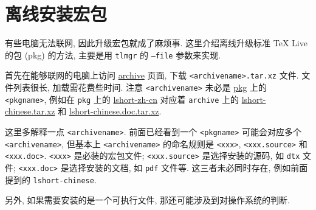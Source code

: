 
\chapter{离线安装宏包}

有些电脑无法联网,
因此升级宏包就成了麻烦事.
这里介绍离线升级标准 \TeX{} Live 的包 (pkg) 的方法,
主要是用 \texttt{tlmgr} 的 \texttt{--file} 参数来实现.

首先在能够联网的电脑上访问
\href{https://ctan.org/tex-archive/systems/texlive/tlnet/archive}{archive}
页面, 下载 \texttt{<archivename>.tar.xz} 文件.
文件列表很长, 加载需花费些时间.
注意 \texttt{<archivename>} 未必是 \href{https://ctan.org/pkg/}{pkg} 上的 \texttt{<pkgname>},
例如在 \texttt{pkg} 上的
\href{https://ctan.org/pkg/lshort-zh-cn}{lshort-zh-cn}
对应着 \texttt{archive} 上的
\href{http://mirrors.ctan.org/systems/texlive/tlnet/archive/lshort-chinese.tar.xz}{lshort-chinese.tar.xz}
和
\href{http://mirrors.ctan.org/systems/texlive/tlnet/archive/lshort-chinese.doc.tar.xz}{lshort-chinese.doc.tar.xz}.

这里多解释一点 \texttt{<archivename>}.
前面已经看到一个 \texttt{<pkgname>} 可能会对应多个 \texttt{<archivename>},
但基本上 \texttt{<archivename>} 的命名规则是 \texttt{<xxx>},
\texttt{<xxx.source>} 和 \texttt{<xxx.doc>}.
\texttt{<xxx>} 是必装的宏包文件;
\texttt{<xxx.source>} 是选择安装的源码, 如 \texttt{dtx} 文件;
\texttt{<xxx.doc>} 是选择安装的文档, 如 \texttt{pdf} 文件等.
这三者未必同时存在, 例如前面提到的 \texttt{lshort-chinese}.

另外, 如果需要安装的是一个可执行文件, 那还可能涉及到对操作系统的判断.
